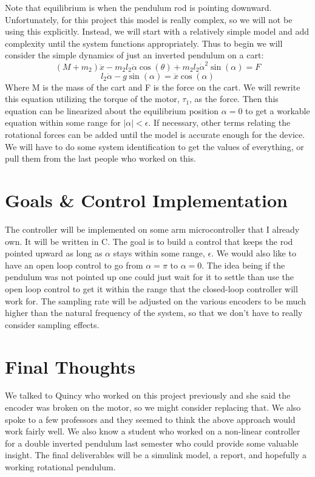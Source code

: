 \documentclass{article}
\begin{document}
Note that equilibrium is when the pendulum rod is pointing downward. Unfortunately, for this project this model is really complex, so we will not be using this explicitly. Instead, we will start with a relatively simple model and add complexity until the system functions appropriately. Thus to begin we will consider the simple dynamics of just an inverted pendulum on a cart:
\[(M+m_2)\ddot{x}-m_2l_2\ddot{\alpha}\cos(\theta)+m_2l_2\dot{\alpha}^2\sin(\alpha)=F\]
\[l_2\ddot{\alpha}-g\sin(\alpha)=\ddot{x}\cos(\alpha)\]
Where M is the mass of the cart and F is the force on the cart. We will rewrite this equation utilizing the torque of the motor, $\tau_1$, as the force. Then this equation can be linearized about the equilibrium position $\alpha=0$ to get a workable equation within some range for $\lvert\alpha\rvert<\epsilon$. If necessary, other terms relating the rotational forces can be added until the model is accurate enough for the device. We will have to do some system identification to get the
values of everything, or pull them from the last people who worked on this.

\section*{Goals \& Control Implementation}
The controller will be implemented on some arm microcontroller that I already own. It will be written in C. The goal is to build a control that keeps the rod pointed upward as long as $\alpha$ stays within some range, $\epsilon$. We would also like to have an open loop control to go from $\alpha=\pi$ to $\alpha=0$. The idea being if the pendulum was not pointed up one could just wait for it to settle than use the open loop control to get it within the range that the closed-loop controller
will work for. The sampling rate will be adjusted on the various encoders to be much higher than the natural frequency of the system, so that we don't have to really consider sampling effects.

\section*{Final Thoughts}
We talked to Quincy who worked on this project previously and she said the encoder was broken on the motor, so we might consider replacing that. We also spoke to a few professors and they seemed to think the above approach would work fairly well. We also know a student who worked on a non-linear controller for a double inverted pendulum last semester who could provide some valuable insight. The final deliverables will be a simulink model, a report, and hopefully a working rotational
pendulum.
\end{document}
